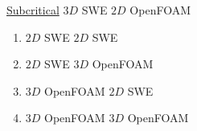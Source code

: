 \begin{frame}
\end{frame}



\begin{frame}
\begin{minipage}{0.5\textwidth}
\centering
\Large \underline{Subcritical} $3D$ SWE    $2D$ OpenFOAM 
\end{minipage}
\hspace{5cm}
\begin{minipage}{0.21\textwidth}
{\scriptsize
\begin{tcolorbox}[colframe=black, colback=white] 
\setlength{\leftmargini}{0pt}
\begin{enumerate}
\item[] {\color{black!50}$2D$ SWE    $2D$ SWE}
\item[] {\color{black!50}$2D$ SWE    $3D$ OpenFOAM}  
\item[] $3D$ OpenFOAM     $2D$ SWE
\item[] {\color{black!50}$3D$ OpenFOAM     $3D$ OpenFOAM}
\end{enumerate}
\end{tcolorbox}}
\end{minipage}


\end{frame}
